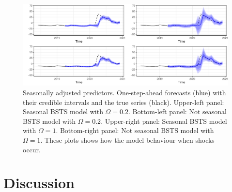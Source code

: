\documentclass[
  12pt,
]{book}
\theoremstyle{break}
\theoremstyle{nonumberplain}
\begin{document}
\begin{figure}[H]

{\centering \includegraphics{Dynamic-Shrinkage-in-Bayesian-Structural-Time-Series-and-Vector-Autoregressive-Models_files/figure-latex/myfig120-1} 

}

\caption{Seasonally adjusted predictors. One-step-ahead forecasts (blue) with their credible intervals and the true series (black). Upper-left panel: Seasonal BSTS model with $\Omega=0.2$. Bottom-left panel: Not seasonal BSTS model with $\Omega=0.2$. Upper-right panel: Seasonal BSTS model with $\Omega=1$. Bottom-right panel: Not seasonal BSTS model with $\Omega=1$. These plots shows how the model behaviour when shocks occur.}\label{fig:myfig120}
\end{figure}

\section{Discussion}
\end{document}
